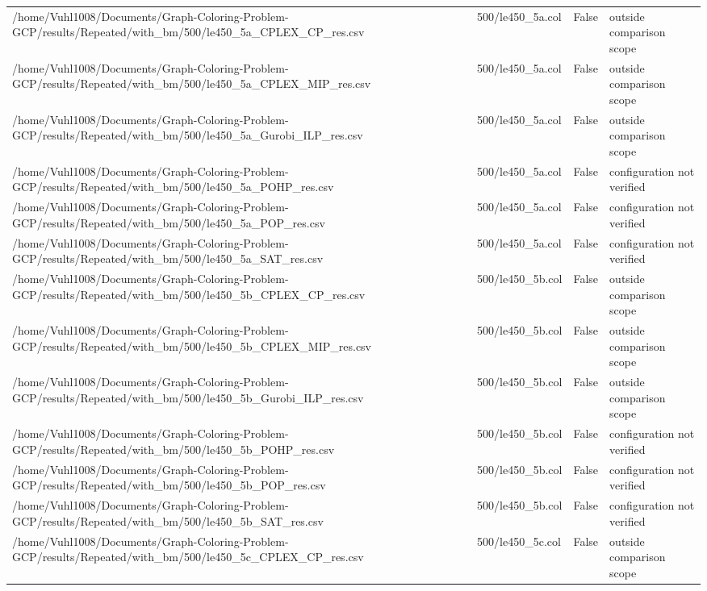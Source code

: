 \begin{table}[htbp]
\begin{tabular}{llll}
/home/Vuhl1008/Documents/Graph-Coloring-Problem-GCP/results/Repeated/with\_bm/500/le450\_5a\_CPLEX\_CP\_res.csv & 500/le450\_5a.col & False & outside comparison scope \\
/home/Vuhl1008/Documents/Graph-Coloring-Problem-GCP/results/Repeated/with\_bm/500/le450\_5a\_CPLEX\_MIP\_res.csv & 500/le450\_5a.col & False & outside comparison scope \\
/home/Vuhl1008/Documents/Graph-Coloring-Problem-GCP/results/Repeated/with\_bm/500/le450\_5a\_Gurobi\_ILP\_res.csv & 500/le450\_5a.col & False & outside comparison scope \\
/home/Vuhl1008/Documents/Graph-Coloring-Problem-GCP/results/Repeated/with\_bm/500/le450\_5a\_POHP\_res.csv & 500/le450\_5a.col & False & configuration not verified \\
/home/Vuhl1008/Documents/Graph-Coloring-Problem-GCP/results/Repeated/with\_bm/500/le450\_5a\_POP\_res.csv & 500/le450\_5a.col & False & configuration not verified \\
/home/Vuhl1008/Documents/Graph-Coloring-Problem-GCP/results/Repeated/with\_bm/500/le450\_5a\_SAT\_res.csv & 500/le450\_5a.col & False & configuration not verified \\
/home/Vuhl1008/Documents/Graph-Coloring-Problem-GCP/results/Repeated/with\_bm/500/le450\_5b\_CPLEX\_CP\_res.csv & 500/le450\_5b.col & False & outside comparison scope \\
/home/Vuhl1008/Documents/Graph-Coloring-Problem-GCP/results/Repeated/with\_bm/500/le450\_5b\_CPLEX\_MIP\_res.csv & 500/le450\_5b.col & False & outside comparison scope \\
/home/Vuhl1008/Documents/Graph-Coloring-Problem-GCP/results/Repeated/with\_bm/500/le450\_5b\_Gurobi\_ILP\_res.csv & 500/le450\_5b.col & False & outside comparison scope \\
/home/Vuhl1008/Documents/Graph-Coloring-Problem-GCP/results/Repeated/with\_bm/500/le450\_5b\_POHP\_res.csv & 500/le450\_5b.col & False & configuration not verified \\
/home/Vuhl1008/Documents/Graph-Coloring-Problem-GCP/results/Repeated/with\_bm/500/le450\_5b\_POP\_res.csv & 500/le450\_5b.col & False & configuration not verified \\
/home/Vuhl1008/Documents/Graph-Coloring-Problem-GCP/results/Repeated/with\_bm/500/le450\_5b\_SAT\_res.csv & 500/le450\_5b.col & False & configuration not verified \\
/home/Vuhl1008/Documents/Graph-Coloring-Problem-GCP/results/Repeated/with\_bm/500/le450\_5c\_CPLEX\_CP\_res.csv & 500/le450\_5c.col & False & outside comparison scope \\

\end{tabular}
\end{table}
